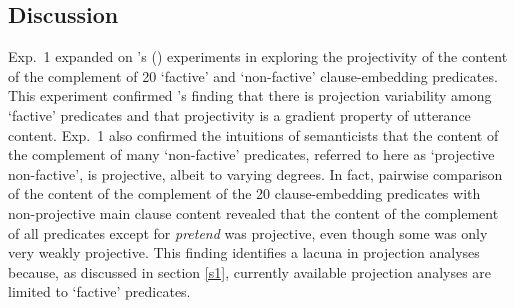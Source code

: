 \documentclass[11pt,fleqn]{article}
\newcommand{\6}{\mbox{$[\hspace*{-.6mm}[$}}
\newcommand{\9}{\mbox{$]\hspace*{-.6mm}]$}}
\newcommand{\citepos}[1]{\citeauthor{#1}'s \citeyear{#1}}
\newcommand{\citetpos}[1]{\citeauthor{#1}'s (\citeyear{#1})}
\begin{document}
 

\subsection{Discussion}

Exp.~1 expanded on \citetpos{tbd-variability} experiments in exploring the projectivity of the content of the complement of 20 `factive' and `non-factive' clause-embedding predicates. This experiment confirmed 
\citepos{tbd-variability} finding that there is projection variability among `factive' predicates and that projectivity is a gradient property of utterance content. Exp.~1 also confirmed the intuitions of semanticists that the content of the complement of many `non-factive' predicates, referred to here as `projective non-factive', is projective, albeit to varying degrees. In fact, pairwise comparison of the content of the complement of the 20 clause-embedding predicates with non-projective main clause content revealed that the content of the complement of all predicates except for {\em pretend} was projective, even though some was only very weakly projective. This finding identifies a lacuna in projection analyses because, as discussed in section \ref{s1}, currently available projection analyses are limited to `factive' predicates. 
\end{document}
